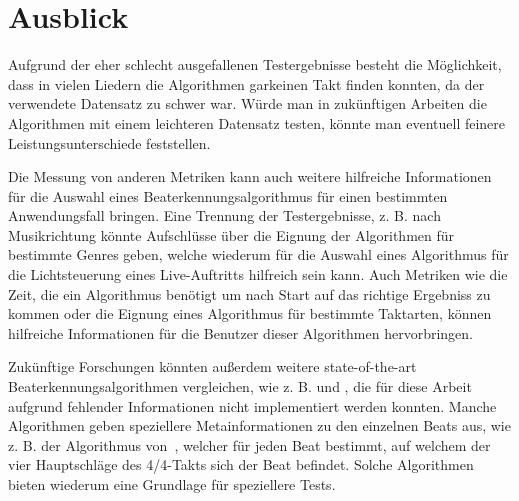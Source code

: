 \section{Ausblick}
{
	Aufgrund der eher schlecht ausgefallenen Testergebnisse besteht die Möglichkeit,
		dass in vielen Liedern die Algorithmen garkeinen Takt finden konnten,
		da der verwendete Datensatz zu schwer war.
	Würde man in zukünftigen Arbeiten die Algorithmen mit einem leichteren Datensatz testen,
		könnte man eventuell feinere Leistungsunterschiede feststellen.

	Die Messung von anderen Metriken kann auch weitere hilfreiche Informationen für die Auswahl eines Beaterkennungsalgorithmus für einen bestimmten Anwendungsfall bringen.
	Eine Trennung der Testergebnisse, z. B. nach Musikrichtung könnte Aufschlüsse über die Eignung der Algorithmen für bestimmte Genres geben,
		welche wiederum für die Auswahl eines Algorithmus für die Lichtsteuerung eines Live-Auftritts hilfreich sein kann.
	Auch Metriken wie die Zeit,
		die ein Algorithmus benötigt um nach Start auf das richtige Ergebniss zu kommen
		oder die Eignung eines Algorithmus für bestimmte Taktarten,
		können hilfreiche Informationen für die Benutzer dieser Algorithmen hervorbringen.

	Zukünftige Forschungen könnten au{\ss}erdem weitere state-of-the-art Beaterkennungsalgorithmen vergleichen,
		wie z. B. \cite{2000_Di} und \cite{2001_Go},
		die für diese Arbeit aufgrund fehlender Informationen nicht implementiert werden konnten.
	Manche Algorithmen geben speziellere Metainformationen zu den einzelnen Beats aus,
		wie z. B. der Algorithmus von~\cite{2001_Go},
		welcher für jeden Beat bestimmt,
		auf welchem der vier Hauptschläge des 4/4-Takts sich der Beat befindet.
	Solche Algorithmen bieten wiederum eine Grundlage für speziellere Tests.
}
